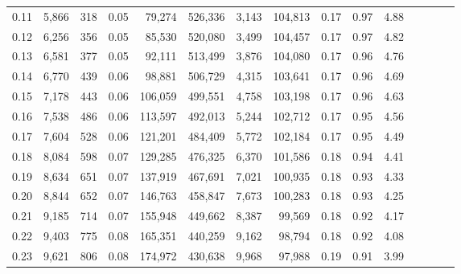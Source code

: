 \begin{tabular}{rrrcrrrrrrrrrrr}
0.11 &   5,866 &    318 &                                       0.05 &   79,274 &  526,336 &    3,143 &  104,813 &  0.17 &  0.97 &                         4.88 \\
0.12 &   6,256 &    356 &                                       0.05 &   85,530 &  520,080 &    3,499 &  104,457 &  0.17 &  0.97 &                         4.82 \\
0.13 &   6,581 &    377 &                                       0.05 &   92,111 &  513,499 &    3,876 &  104,080 &  0.17 &  0.96 &                         4.76 \\
0.14 &   6,770 &    439 &                                       0.06 &   98,881 &  506,729 &    4,315 &  103,641 &  0.17 &  0.96 &                         4.69 \\
0.15 &   7,178 &    443 &                                       0.06 &  106,059 &  499,551 &    4,758 &  103,198 &  0.17 &  0.96 &                         4.63 \\
0.16 &   7,538 &    486 &                                       0.06 &  113,597 &  492,013 &    5,244 &  102,712 &  0.17 &  0.95 &                         4.56 \\
0.17 &   7,604 &    528 &                                       0.06 &  121,201 &  484,409 &    5,772 &  102,184 &  0.17 &  0.95 &                         4.49 \\
0.18 &   8,084 &    598 &                                       0.07 &  129,285 &  476,325 &    6,370 &  101,586 &  0.18 &  0.94 &                         4.41 \\
0.19 &   8,634 &    651 &                                       0.07 &  137,919 &  467,691 &    7,021 &  100,935 &  0.18 &  0.93 &                         4.33 \\
0.20 &   8,844 &    652 &                                       0.07 &  146,763 &  458,847 &    7,673 &  100,283 &  0.18 &  0.93 &                         4.25 \\
0.21 &   9,185 &    714 &                                       0.07 &  155,948 &  449,662 &    8,387 &   99,569 &  0.18 &  0.92 &                         4.17 \\
0.22 &   9,403 &    775 &                                       0.08 &  165,351 &  440,259 &    9,162 &   98,794 &  0.18 &  0.92 &                         4.08 \\
0.23 &   9,621 &    806 &                                       0.08 &  174,972 &  430,638 &    9,968 &   97,988 &  0.19 &  0.91 &                         3.99 \\

\end{tabular}
